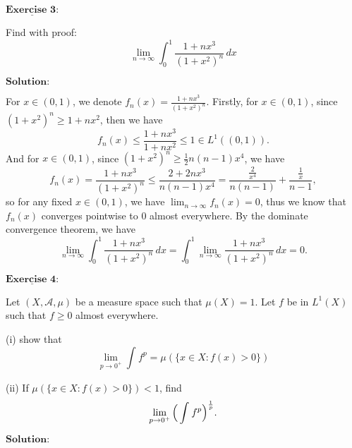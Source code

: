 \documentclass[12pt,a4paper]{ctexart}
\begin{document}
\newpage

$\underline{\textbf{Exercise 3:}}$

Find with proof:
\begin{equation*}
    \lim_{n \to \infty} \int_{0}^{1} \frac{1 + n x^{3}}{(1 + x^{2})^{n}} \, d x 
\end{equation*}

\vspace{8pt}
$\textbf{Solution:}$

For $x \in (0, 1)$, we denote $f_{n}(x) = \frac{1 + n x^{3}}{(1 + x^{2})^{n}}$. Firstly, for $x \in (0, 1)$, since $(1 + x^{2})^{n} \geq 1 + n x^{2}$, then we have
\begin{equation*}
    f_{n}(x) \leq \frac{1 + n x^{3}}{1 + n x^{2}} \leq 1 \in L^{1}((0, 1)).
\end{equation*}
And for $x \in (0, 1)$, since $(1 + x^{2})^{n} \geq \frac{1}{2}n(n-1) x^{4}$, we have
\begin{equation*}
    f_{n}(x) = \frac{1 + n x^{3}}{(1 + x^{2})^{n}} \leq \frac{2 + 2 n x^{3}}{n(n-1) x^{4}}  = \frac{\frac{2}{x^{4}}}{n(n - 1)} + \frac{\frac{1}{x}}{n-1},
\end{equation*}
so for any fixed $x \in (0, 1)$, we have $\lim_{n \to \infty} f_{n} (x) = 0$, thus we know that $f_{n}(x)$ converges pointwise to $0$ almost everywhere. By the dominate convergence theorem, we have
\begin{equation*}
    \lim_{n \to \infty} \int_{0}^{1} \frac{1 + n x^{3}}{(1 + x^{2})^{n}} \, d x = \int_{0}^{1} \lim_{n \to \infty} \frac{1 + n x^{3}}{(1 + x^{2})^{n}} \, d x = 0.
\end{equation*}

\newpage

$\underline{\textbf{Exercise 4:}}$

Let $(X, \mathcal{A}, \mu)$ be a measure space such that $\mu(X) = 1$. Let $f$ be in $L^{1}(X)$ such that $f \geq 0$ almost everywhere.

(i) show that
\begin{equation*}
    \lim_{p \to 0^{+}} \int_{}^{} f^{p} = \mu(\{x \in X:  f(x) > 0\})
\end{equation*}

(ii) If $\mu(\{x \in X:  f(x) > 0\}) < 1$, find
\begin{equation*}
    \lim_{p \to 0^{+}} \Big{(} \int_{}^{} f^{p} \Big{)}^{\frac{1}{p}}. 
\end{equation*}


\vspace{8pt}
$\textbf{Solution:}$
\end{document}
